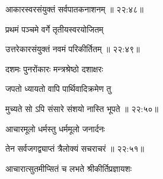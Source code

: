 
{\devanagarifont आकारस्वरसंयुक्तं सर्वपातकनाशनम् {॥ २२:४८॥} \veg\dontdisplaylinenum }%

{\devanagarifont प्रथमं पञ्चमे वर्गे तृतीयस्वरयोजितम् \thinspace{\dandab} \dontdisplaylinenum }%
 

{\devanagarifont उत्तरेकारसंयुक्तं नवमं परिकीर्तितम् {॥ २२:४९॥} \veg\dontdisplaylinenum }%

{\devanagarifont दशमः पुनरोंकारः मन्त्रश्रेष्ठो दशाक्षरः \thinspace{\dandab} \dontdisplaylinenum }%

{\devanagarifont जपतो ध्यायतो वापि पार्थिवादिक्रमेण तु  \danda\dontdisplaylinenum }%
 

{\devanagarifont मुच्यते सो ऽपि संसारे संशयो नास्ति भूपते {॥ २२:५०॥} \veg\dontdisplaylinenum }%


{\devanagarifont आचारमूलो धर्मस्तु धर्ममूलो जनार्दनः \thinspace{\dandab} \dontdisplaylinenum }%
 

{\devanagarifont तेन सर्वजगद्व्याप्तं त्रैलोक्यं सचराचरं {॥ २२:५१॥} \veg\dontdisplaylinenum }%
 
\ujvers{}    %


\nemslokab

{\devanagarifont आचारात्सुतमीप्सितं च लभते श्रीकीर्तिप्रज्ञायशः  \danda\dontdisplaylinenum }%

